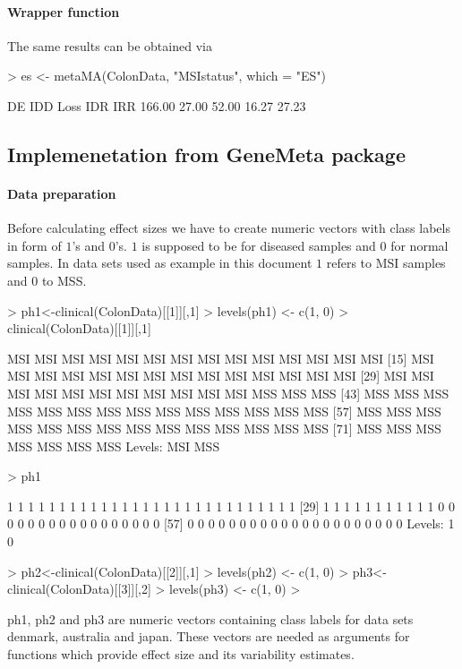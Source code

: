\documentclass[a4paper]{report}
\begin{document}
\paragraph{Wrapper function}
The same results can be obtained via
\begin{Schunk}
\begin{Sinput}
> es <- metaMA(ColonData, "MSIstatus", which = "ES")
\end{Sinput}
\begin{Soutput}
    DE    IDD   Loss    IDR    IRR 
166.00  27.00  52.00  16.27  27.23 
\end{Soutput}
\end{Schunk}

\subsection*{Implemenetation from GeneMeta package}
\paragraph{Data preparation}
Before calculating effect sizes we have to create numeric vectors with class labels in form of $1$'s and $0$'s. $1$ is supposed to be for diseased samples and $0$ for normal samples. In data sets used as example in this document $1$ refers to MSI samples and $0$ to MSS.  
\begin{Schunk}
\begin{Sinput}
> ph1<-clinical(ColonData)[[1]][,1]
> levels(ph1) <- c(1, 0)
> clinical(ColonData)[[1]][,1]
\end{Sinput}
\begin{Soutput}
 [1] MSI MSI MSI MSI MSI MSI MSI MSI MSI MSI MSI MSI MSI MSI
[15] MSI MSI MSI MSI MSI MSI MSI MSI MSI MSI MSI MSI MSI MSI
[29] MSI MSI MSI MSI MSI MSI MSI MSI MSI MSI MSI MSS MSS MSS
[43] MSS MSS MSS MSS MSS MSS MSS MSS MSS MSS MSS MSS MSS MSS
[57] MSS MSS MSS MSS MSS MSS MSS MSS MSS MSS MSS MSS MSS MSS
[71] MSS MSS MSS MSS MSS MSS MSS
Levels: MSI MSS
\end{Soutput}
\begin{Sinput}
> ph1
\end{Sinput}
\begin{Soutput}
 [1] 1 1 1 1 1 1 1 1 1 1 1 1 1 1 1 1 1 1 1 1 1 1 1 1 1 1 1 1
[29] 1 1 1 1 1 1 1 1 1 1 1 0 0 0 0 0 0 0 0 0 0 0 0 0 0 0 0 0
[57] 0 0 0 0 0 0 0 0 0 0 0 0 0 0 0 0 0 0 0 0 0
Levels: 1 0
\end{Soutput}
\end{Schunk}
\begin{Schunk}
\begin{Sinput}
> ph2<-clinical(ColonData)[[2]][,1]
> levels(ph2) <- c(1, 0)
> ph3<-clinical(ColonData)[[3]][,2]
> levels(ph3) <- c(1, 0)
> 
\end{Sinput}
\end{Schunk}
{\ttfamily ph1}, {\ttfamily ph2} and {\ttfamily ph3} are numeric vectors containing class labels for data sets {\ttfamily denmark}, {\ttfamily australia} and {\ttfamily japan}.  These vectors are needed as arguments for functions which provide effect size and its variability estimates. 
\end{document}
